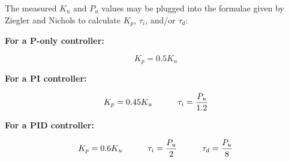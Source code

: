 












The measured $K_u$ and $P_u$ values may be plugged into the formulae given by Ziegler and Nichols to calculate $K_p$, $\tau_i$, and/or $\tau_d$:

\vskip 10pt

\noindent
{\bf For a P-only controller:}

$$K_p = 0.5 K_u$$

\vskip 10pt

\noindent
{\bf For a PI controller:}

$$K_p = 0.45 K_u \hskip 30pt \tau_i = {P_u \over 1.2}$$

\vskip 10pt

\noindent
{\bf For a PID controller:}

$$K_p = 0.6 K_u \hskip 30pt \tau_i = {P_u \over 2} \hskip 30pt \tau_d = {P_u \over 8}$$



